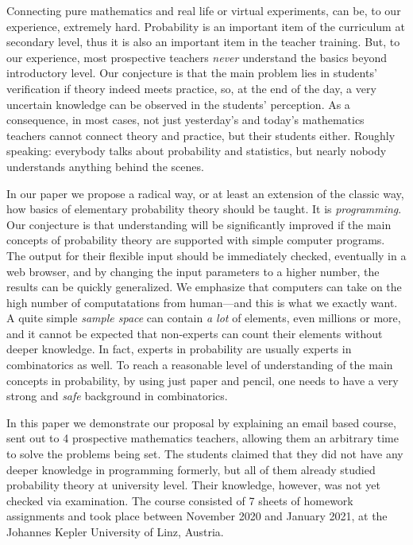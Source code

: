 \documentclass[]{interact}
\theoremstyle{plain}%
\theoremstyle{definition}
\theoremstyle{remark}
\begin{document}
Connecting pure mathematics and real life or virtual experiments, can be, to our experience,
extremely hard. Probability is an important item of the curriculum at secondary level,
thus it is also an important item in the teacher training. But, to our experience,
most prospective teachers \textit{never} understand the basics beyond introductory level.
Our conjecture is that the main problem lies in students' verification if theory indeed meets practice,
so, at the end of the day, a very uncertain knowledge can be observed in the students' perception. As a consequence,
in most cases, not just yesterday's and today's mathematics teachers cannot connect
theory and practice, but their students either. Roughly speaking: everybody talks about probability and
statistics, but nearly nobody understands anything behind the scenes.

In our paper we propose a radical way, or at least an extension of the classic way, how
basics of elementary probability theory should be taught. It is \textit{programming}.
Our conjecture is that understanding will be significantly improved if the main concepts
of probability theory are supported with simple computer programs. The output for their flexible input
should be immediately checked, eventually in a web browser, and by changing the input parameters
to a higher number, the results can be quickly generalized. We emphasize that computers
can take on the high number of computatations from human---and this is what we exactly want.
A quite simple \textit{sample space} can contain \textit{a lot} of elements, even millions or more, and it cannot
be expected that non-experts can count their elements without deeper knowledge. In fact,
experts in probability are usually experts in combinatorics as well. To reach a reasonable
level of understanding of the main concepts in probability, by using just paper and pencil,
one needs to have a very strong and \textit{safe} background in combinatorics.

In this paper we demonstrate our proposal by explaining an email based course, sent out
to 4 prospective mathematics teachers, allowing them an arbitrary time to solve the problems being set.
The students claimed that they did not have any deeper knowledge in programming formerly, but all of
them already studied probability theory at university level. Their knowledge, however, was
not yet checked via examination. The course consisted of 7 sheets of homework assignments
and took place between November 2020 and January 2021, at the Johannes Kepler University of Linz, Austria.
\end{document}

